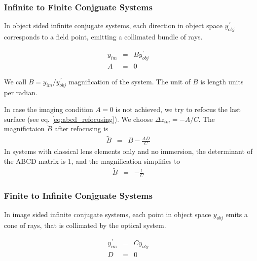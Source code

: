 \documentclass[12pt,a4paper,twoside,openright,BCOR10mm,headsepline,titlepage,abstracton,chapterprefix,final]{scrreprt}
\begin{document}
\subsubsection{Infinite to Finite Conjguate Systems}
In object sided infinite conjugate systems, each direction in object space $y^{\,\prime}_{obj}$ corresponds to a field point, 
emitting a collimated bundle of rays.

\begin{eqnarray}
   y_{im} &=& B y^{\,\prime}_{obj} \\
   A &=& 0
\end{eqnarray}

We call $B = y_{im} / y^{\,\prime}_{obj}$ magnification of the system.
The unit of $B$ is length units per radian.

In case the imaging condition $A=0$ is not achieved, we try to refocus the last surface (see eq. \ref{eq:abcd_refocusing}).
We choose $\Delta z_{im} = - A / C $.
The magnifictaion $\tilde{B}$ after refocusing is
\begin{eqnarray}
 \tilde{B} &=& B - \frac{AD}{C} 
\end{eqnarray}
In systems with classical lens elements only and no immersion, the determinant of the ABCD matrix is 1, and the magnification simplifies to
\begin{eqnarray}
 \tilde{B} &=& - \frac{1}{C} 
\end{eqnarray}


\subsubsection{Finite to Infinite Conjguate Systems}
In image sided infinite conjugate systems, each point in object space $y_{obj}$ emits a cone of rays, 
that is collimated by the optical system.

\begin{eqnarray}
   y^{\,\prime}_{im} &=& C y_{obj} \\
   D &=& 0
\end{eqnarray}
\end{document}
